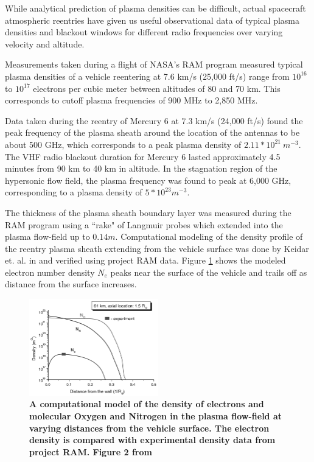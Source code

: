 \documentclass[twocolumn]{article}
\begin{document}
While analytical prediction of plasma densities can be difficult, actual spacecraft atmospheric reentries have given us useful observational data of typical plasma densities and blackout windows for different radio frequencies over varying velocity and altitude.

Measurements taken during a flight of NASA's RAM program measured typical plasma densities of a vehicle reentering at 7.6 km/s (25,000 ft/s) range from $10^{16}$ to $10^{17}$ electrons per cubic meter between altitudes of 80 and 70 km.\cite{akey_radio_1970}
This corresponds to cutoff plasma frequencies of 900 MHz to 2,850 MHz.

Data taken during the reentry of Mercury 6 at 7.3 km/s (24,000 ft/s) found the peak frequency of the plasma sheath around the location of the antennas to be about 500 GHz, which corresponds to a peak plasma density of $2.11*10^{21} \  m^{-3}$.
The VHF radio blackout duration for Mercury 6 lasted approximately 4.5 minutes from 90 km to 40 km in altitude.
In the stagnation region of the hypersonic flow field, the plasma frequency was found to peak at 6,000 GHz, corresponding to a plasma density of $5*10^{23} m^{-3}$. \cite{lehnert_plasma_1964}

The thickness of the plasma sheath boundary layer was measured during the RAM program using a ``rake" of Langmuir probes which extended into the plasma flow-field up to $0.14m$.\cite{rybak_causes_1970}
Computational modeling of the density profile of the reentry plasma sheath extending from the vehicle surface was done by Keidar et. al. in \cite{keidar_electromagnetic_2008} and verified using project RAM data.
Figure \ref{fig:PlasmaDensity_Keideretal} shows the modeled electron number density $N_e$ peaks near the surface of the vehicle and trails off as distance from the surface increases.

\begin{figure}[h]
\centering
\includegraphics[width=0.5\textwidth]{Images/PlasmaDensity_Keideretal}
\caption[Computational model of plasma density at varying distances from the vehicle surface.]{\textbf{A computational model of the density of electrons and molecular Oxygen and Nitrogen in the plasma flow-field at varying distances from the vehicle surface. The electron density is compared with experimental density data from project RAM. Figure 2 from \cite{keidar_electromagnetic_2008}}}
\label{fig:PlasmaDensity_Keideretal}
\end{figure}
\end{document}
